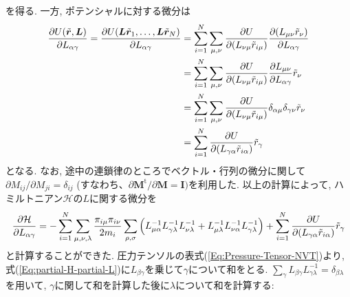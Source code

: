 を得る. 一方, ポテンシャルに対する微分は
\begin{align}
  \frac{\partial U(\tilde{\bm{r}}, \bm{L})}{\partial L_{\alpha\gamma}}
  =
  \frac{\partial U(\bm{L}\tilde{\bm{r}}_{1},\ldots,\bm{L}\tilde{\bm{r}}_{N})}{\partial L_{\alpha\gamma}}
  &=
  \sum_{i=1}^{N}\sum_{\mu,\nu}
  \frac{\partial U}{\partial (L_{\nu\mu} \Tilde{r}_{i\mu})}
  \frac{\partial (L_{\mu\nu}\tilde{r}_{\nu})}{\partial L_{\alpha\gamma}}
  \\
  &=
  \sum_{i=1}^{N}\sum_{\mu,\nu}
  \frac{\partial U}{\partial (L_{\nu\mu} \Tilde{r}_{i\mu})}
  \frac{\partial L_{\mu\nu}}{\partial L_{\alpha\gamma}} \tilde{r}_{\nu}
  \\
  &=
  \sum_{i=1}^{N}\sum_{\mu,\nu}
  \frac{\partial U}{\partial (L_{\nu\mu} \Tilde{r}_{i\mu})}
  \delta_{\alpha\mu}\delta_{\gamma\nu}\tilde{r}_{\nu}
  \\
  &=
  \sum_{i=1}^{N}
  \frac{\partial U}{\partial (L_{\gamma\alpha} \Tilde{r}_{i\alpha})}
  \tilde{r}_{\gamma}
\end{align}
となる. なお, 途中の連鎖律のところでベクトル・行列の微分に関して$\partial M_{ij}/\partial M_{ji} = \delta_{ij}$ (すなわち、$\partial \bm{M}^{\mathrm{t}}/\partial \bm{M} = \bm{I})$を利用した.
以上の計算によって, ハミルトニアン$\mathcal{H}$の$L$に関する微分を
\begin{align}
  \frac{\partial \mathcal{H}}{\partial L_{\alpha\gamma}} =
  -\sum_{i=1}^{N} \sum_{\mu,\nu,\lambda} \frac{\pi_{i\mu}\pi_{i\nu}}{2m_{i}}
  \sum_{\rho,\sigma}
  \left(
    L_{\mu\alpha}^{-1} L_{\gamma\lambda}^{-1} L_{\nu\lambda}^{-1} +
    L_{\mu\lambda}^{-1} L_{\nu\alpha}^{-1} L_{\gamma\lambda}^{-1}
  \right) +
  \sum_{i=1}^{N}
  \frac{\partial U}{\partial (L_{\gamma\alpha} \Tilde{r}_{i\alpha})}
  \tilde{r}_{\gamma}
  \label{Eq:partial-H-partial-L}
\end{align}
と計算することができた. 圧力テンソルの表式(\ref{Eq:Pressure-Tensor-NVT})より, 式(\ref{Eq:partial-H-partial-L})に$L_{\beta\gamma}$を乗じて$\gamma$について和をとる. 
$\sum_{\gamma} L_{\beta\gamma}L_{\gamma\lambda}^{-1} = \delta_{\beta\lambda}$を用いて, $\gamma$に関して和を計算した後に$\lambda$について和を計算する:
